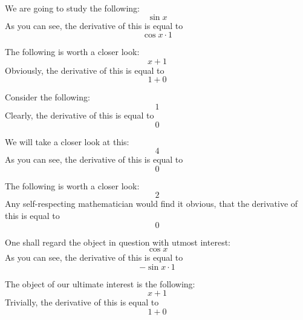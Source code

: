 \documentclass{article}
\begin{document}
We are going to study the following:
\begin{equation}
\sin x 
\end{equation}
As you can see, the derivative of this is equal to
\begin{equation}
\cos x \cdot 1 
\end{equation}

The following is worth a closer look:
\begin{equation}
x + 1 
\end{equation}
Obviously, the derivative of this is equal to
\begin{equation}
1 + 0 
\end{equation}

Consider the following:
\begin{equation}
1 
\end{equation}
Clearly, the derivative of this is equal to
\begin{equation}
0 
\end{equation}

We will take a closer look at this:
\begin{equation}
4 
\end{equation}
As you can see, the derivative of this is equal to
\begin{equation}
0 
\end{equation}

The following is worth a closer look:
\begin{equation}
2 
\end{equation}
Any self-respecting mathematician would find it obvious, that the derivative of this is equal to
\begin{equation}
0 
\end{equation}

One shall regard the object in question with utmost interest:
\begin{equation}
\cos x 
\end{equation}
As you can see, the derivative of this is equal to
\begin{equation}
-\sin x \cdot 1 
\end{equation}

The object of our ultimate interest is the following:
\begin{equation}
x + 1 
\end{equation}
Trivially, the derivative of this is equal to
\begin{equation}
1 + 0 
\end{equation}
\end{document}
